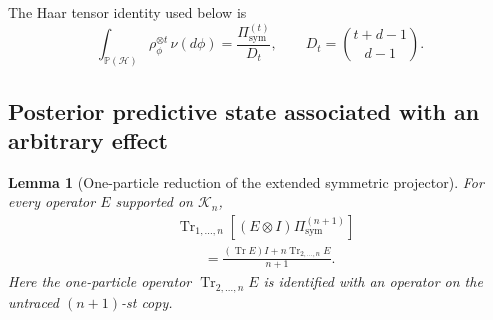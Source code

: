 \documentclass[journal]{IEEEtran}
\newtheorem{lemma}[theorem]{Lemma}
\begin{document}
The Haar tensor identity used below is
\begin{equation}
    \int_{\mathbb P(\mathcal H)}
    \rho_\phi^{\otimes t}\,\nu(d\phi)
    =
    \frac{\Pi_{\mathrm{sym}}^{(t)}}{D_t},
    \qquad
    D_t=\binom{t+d-1}{d-1}.
    \label{eq:global_haar_tensor_identity}
\end{equation}

\subsection{Posterior predictive state associated with an arbitrary effect}
\label{subsec:global_arbitrary_effect_posterior}

\begin{lemma}[One-particle reduction of the extended symmetric projector]
\label{lem:global_symmetric_projector_partial_trace}
For every operator \(E\) supported on \(\mathcal K_n\),
\begin{equation}
\begin{split}
&\operatorname{Tr}_{1,\ldots,n}
\left[
    (E\otimes I)\Pi_{\mathrm{sym}}^{(n+1)}
\right]\\
&\qquad=
\frac{
    (\operatorname{Tr}E)I
    +n\operatorname{Tr}_{2,\ldots,n}E
}{n+1}.
\end{split}
\label{eq:global_symmetric_projector_partial_trace}
\end{equation}
Here the one-particle operator
\(\operatorname{Tr}_{2,\ldots,n}E\) is identified with an operator on the
untraced \((n+1)\)-st copy.
\end{lemma}
\end{document}
